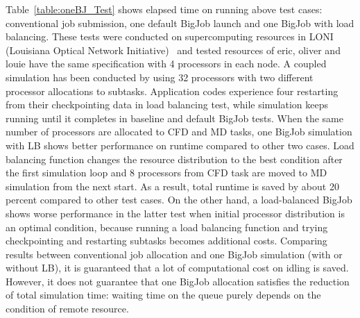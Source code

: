 \documentclass[conference,final]{IEEEtran}
\begin{document}
Table~\ref{table:oneBJ_Test} shows elapsed time on running above test
cases: conventional job submission, one default BigJob launch and one
BigJob with load balancing. These tests were conducted on
supercomputing resources in LONI (Louisiana Optical Network
Initiative)~\cite{LONI_web} and tested resources of eric, oliver and
louie have the same specification with 4 processors in each node. A
coupled simulation has been conducted by using 32 processors with two
different processor allocations to subtasks. Application codes
experience four restarting from their checkpointing data in load
balancing test, while simulation keeps running until it completes in
baseline and default BigJob tests. When the same number of processors
are allocated to CFD and MD tasks, one BigJob simulation with LB shows
better performance on runtime compared to other two cases. Load
balancing function changes the resource distribution to the best
condition after the first simulation loop and 8 processors from CFD
task are moved to MD simulation from the next start. As a result,
total runtime is saved by about 20 percent compared to other test
cases. On the other hand, a load-balanced BigJob shows worse
performance in the latter test when initial processor distribution is
an optimal condition, because running a load balancing function and
trying checkpointing and restarting subtasks becomes additional costs.
Comparing results between conventional job allocation and one BigJob
simulation (with or without LB), it is guaranteed that a lot of
computational cost on idling is saved. However, it does not guarantee
that one BigJob allocation satisfies the reduction of total simulation
time: waiting time on the queue purely depends on the condition of
remote resource.


\end{document}
